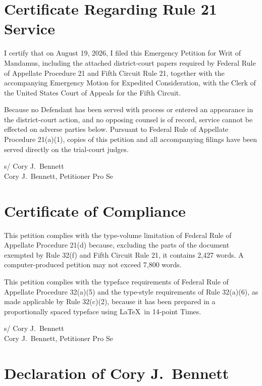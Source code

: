 \documentclass[14pt]{extarticle}
\renewcommand{\FilingDate}{August 19, 2026}
\newcommand{\PetitionWordCount}{2,427}
\begin{document}
\clearpage
\section*{Certificate Regarding Rule 21 Service}

I certify that on \FilingDate, I filed this Emergency Petition for Writ of Mandamus, including the attached district-court papers required by Federal Rule of Appellate Procedure 21 and Fifth Circuit Rule 21, together with the accompanying Emergency Motion for Expedited Consideration, with the Clerk of the United States Court of Appeals for the Fifth Circuit.

Because no Defendant has been served with process or entered an appearance in the district-court action, and no opposing counsel is of record, service cannot be effected on adverse parties below. Pursuant to Federal Rule of Appellate Procedure 21(a)(1), copies of this petition and all accompanying filings have been served directly on the trial-court judges.

\vspace{0.9em}
\noindent s/ Cory J.\ Bennett\\
Cory J.\ Bennett, Petitioner Pro Se

\clearpage
\section*{Certificate of Compliance}

This petition complies with the type-volume limitation of Federal Rule of Appellate Procedure 21(d) because, excluding the parts of the document exempted by Rule 32(f) and Fifth Circuit Rule 21, it contains \PetitionWordCount{} words. A computer-produced petition may not exceed 7,800 words.

This petition complies with the typeface requirements of Federal Rule of Appellate Procedure 32(a)(5) and the type-style requirements of Rule 32(a)(6), as made applicable by Rule 32(c)(2), because it has been prepared in a proportionally spaced typeface using \LaTeX\ in 14-point Times.

\vspace{0.9em}
\noindent s/ Cory J.\ Bennett\\
Cory J.\ Bennett, Petitioner Pro Se

\clearpage
\section*{Declaration of Cory J.\ Bennett}
\end{document}
